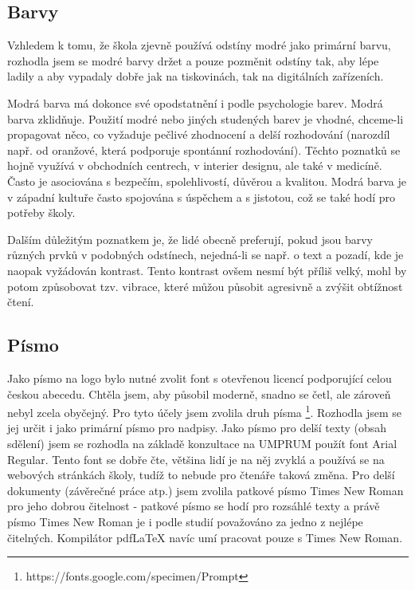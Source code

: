 \documentclass[11pt,a4paper,twoside,openright]{report}
\begin{document}
\subsection{Barvy}
Vzhledem k tomu, že škola zjevně používá odstíny modré jako primární barvu, rozhodla jsem se modré barvy držet a pouze pozměnit odstíny tak, aby lépe ladily a aby vypadaly dobře jak na tiskovinách, tak na digitálních zařízeních.

Modrá barva má dokonce své opodstatnění i podle psychologie barev. Modrá barva zklidňuje. Použití modré nebo jiných studených barev je vhodné, chceme-li propagovat něco, co vyžaduje pečlivé zhodnocení a delší rozhodování (narozdíl např. od oranžové, která podporuje spontánní rozhodování). Těchto poznatků se hojně využívá v obchodních centrech, v interier designu, ale také v medicíně.
\cite{enwiki:1144176285}
Často je asociována s bezpečím, spolehlivostí, důvěrou a kvalitou.\cite{hallock}
Modrá barva je v západní kultuře často spojována s úspěchem a s jistotou, což se také hodí pro potřeby školy. \cite{grafika}

Dalším důležitým poznatkem je, že lidé obecně preferují, pokud jsou barvy různých prvků v podobných odstínech, nejedná-li se např. o text a pozadí, kde je naopak vyžádován kontrast.\cite{enwiki:1144176285}\cite{color} Tento kontrast ovšem nesmí být příliš velký, mohl by potom způsobovat tzv. vibrace, které můžou působit agresivně a zvýšit obtížnost čtení.\cite{grafika}

\subsection{Písmo}
\label{sec:písmo}
Jako písmo na logo bylo nutné zvolit font s otevřenou licencí podporující celou českou abecedu. Chtěla jsem, aby působil moderně, snadno se četl, ale zároveň nebyl zcela obyčejný. Pro tyto účely jsem zvolila druh písma \footnote{https://fonts.google.com/specimen/Prompt}. Rozhodla jsem se jej určit i jako primární písmo pro nadpisy.
Jako písmo pro delší texty (obsah sdělení) jsem se rozhodla na základě konzultace na UMPRUM použít font Arial Regular. Tento font se dobře čte, většina lidí je na něj zvyklá a používá se na webových stránkách školy, tudíž to nebude pro čtenáře taková změna.
Pro delší dokumenty (závěrečné práce atp.) jsem zvolila patkové písmo Times New Roman pro jeho dobrou čitelnost - patkové písmo se hodí pro rozsáhlé texty\cite{grafika} a právě písmo Times New Roman je i podle studií považováno za jedno z nejlépe čitelných.\cite{times} Kompilátor pdfLaTeX navíc umí pracovat pouze s Times New Roman.
\end{document}
